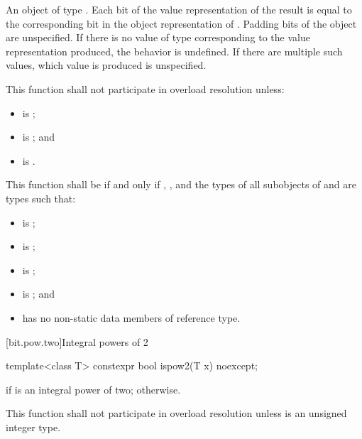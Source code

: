 \begin{itemdescr}
\pnum
\returns
An object of type .
Each bit of the value representation of the result
is equal to the corresponding bit in the object representation
of . Padding bits of the  object are unspecified.
If there is no value of type  corresponding to the
value representation produced, the behavior is undefined.
If there are multiple such values, which value is produced is unspecified.

\pnum
\remarks
This function shall not participate in overload resolution unless:
\begin{itemize}
\item {} is ;
\item {} is ; and
\item {} is .
\end{itemize}
This function shall be  if and only if
, , and the types of all subobjects
of  and  are types  such that:
\begin{itemize}
\item {} is ;
\item {} is ;
\item {} is ;
\item {} is ; and
\item {} has no non-static data members of reference type.
\end{itemize}
\end{itemdescr}

[bit.pow.two]{Integral powers of 2}

%
\begin{itemdecl}
template<class T>
  constexpr bool ispow2(T x) noexcept;
\end{itemdecl}

\begin{itemdescr}
\pnum
\returns
{} if  is an integral power of two;
 otherwise.

\pnum
\remarks
This function shall not participate in overload resolution
unless  is an unsigned integer type.
\end{itemdescr}

